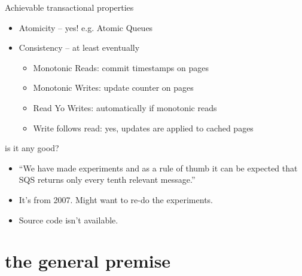 \documentclass{beamer}
\begin{document}
  \begin{frame}{Achievable transactional properties}
    \begin{itemize}
    \item
      Atomicity -- yes! e.g. Atomic Queues
    \item
      Consistency -- at least eventually
      \begin{itemize}
      \item
        Monotonic Reads: commit timestamps on pages
      \item
        Monotonic Writes: update counter on pages
      \item
        Read Yo Writes: automatically if monotonic reads
      \item
        Write follows read: yes, updates are applied to cached pages
      \end{itemize}
    \end{itemize}
  \end{frame}

  \begin{frame}{is it any good?}
    \begin{itemize}
      \item
        ``We have made experiments and as a rule of thumb it can be expected that SQS returns only every tenth relevant message.''
      \item
        It's from 2007. Might want to re-do the experiments.
      \item
        Source code isn't available.
      \end{itemize}
    \end{frame}

\section{the general premise}
\end{document}
